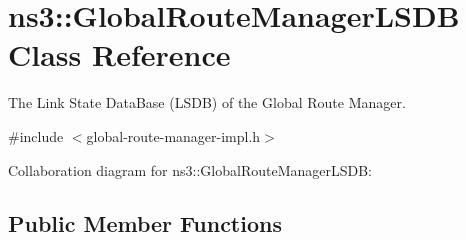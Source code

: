 \hypertarget{classns3_1_1GlobalRouteManagerLSDB}{}\section{ns3\+:\+:Global\+Route\+Manager\+L\+S\+DB Class Reference}
\label{classns3_1_1GlobalRouteManagerLSDB}


The Link State Data\+Base (L\+S\+DB) of the Global Route Manager.  




{\ttfamily \#include $<$global-\/route-\/manager-\/impl.\+h$>$}



Collaboration diagram for ns3\+:\+:Global\+Route\+Manager\+L\+S\+DB\+:
\subsection*{Public Member Functions}
